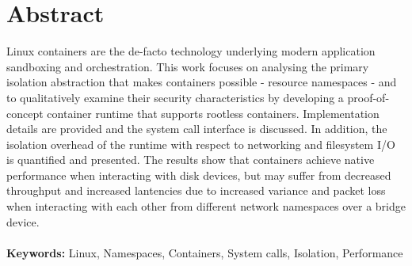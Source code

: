 \chapter*{Abstract}
Linux containers are the de-facto technology underlying 
modern application sandboxing and orchestration. This work focuses 
on analysing the primary isolation abstraction that makes 
containers possible - resource namespaces - and to qualitatively examine their security characteristics
by developing a proof-of-concept container runtime that supports rootless containers. 
Implementation details are provided and the system call interface is discussed.
In addition, the isolation overhead 
of the runtime with respect to networking and filesystem I/O is quantified and presented.
The results show that containers achieve native performance when interacting with 
disk devices, but may suffer from decreased throughput and increased lantencies due to increased variance 
and packet loss when interacting with each other from different network namespaces over a bridge device.
\\
\\
\textbf{Keywords:} Linux, Namespaces, Containers, System calls, Isolation, Performance
